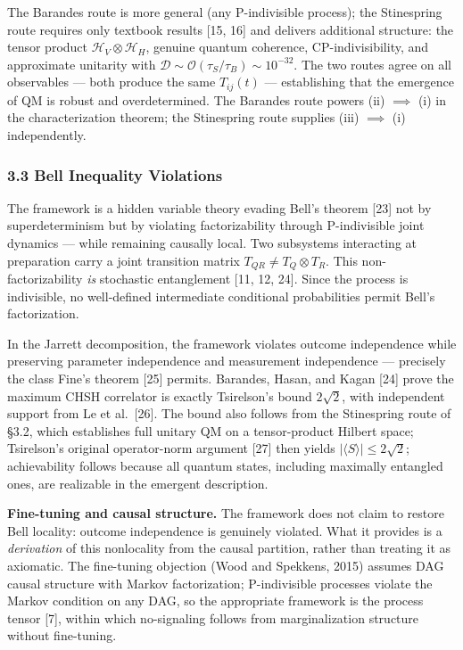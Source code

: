 \documentclass[
]{article}
\begin{document}
The Barandes route is more general (any P-indivisible process); the
Stinespring route requires only textbook results {[}15, 16{]} and
delivers additional structure: the tensor product
\(\mathcal{H}_V \otimes \mathcal{H}_H\), genuine quantum coherence,
CP-indivisibility, and approximate unitarity with
\(\mathcal{D} \sim \mathcal{O}(\tau_S / \tau_B) \sim 10^{-32}\). The two
routes agree on all observables --- both produce the same \(T_{ij}(t)\)
--- establishing that the emergence of QM is robust and overdetermined.
The Barandes route powers (ii) \(\implies\) (i) in the characterization
theorem; the Stinespring route supplies (iii) \(\implies\) (i)
independently.

\hypertarget{bell-inequality-violations}{%
\subsubsection{3.3 Bell Inequality
Violations}\label{bell-inequality-violations}}

The framework is a hidden variable theory evading Bell's theorem
{[}23{]} not by superdeterminism but by violating factorizability
through P-indivisible joint dynamics --- while remaining causally local.
Two subsystems interacting at preparation carry a joint transition
matrix \(T_{QR} \neq T_Q \otimes T_R\). This non-factorizability
\emph{is} stochastic entanglement {[}11, 12, 24{]}. Since the process is
indivisible, no well-defined intermediate conditional probabilities
permit Bell's factorization.

In the Jarrett decomposition, the framework violates outcome
independence while preserving parameter independence and measurement
independence --- precisely the class Fine's theorem {[}25{]} permits.
Barandes, Hasan, and Kagan {[}24{]} prove the maximum CHSH correlator is
exactly Tsirelson's bound \(2\sqrt{2}\), with independent support from
Le et al.~{[}26{]}. The bound also follows from the Stinespring route of
§3.2, which establishes full unitary QM on a tensor-product Hilbert
space; Tsirelson's original operator-norm argument {[}27{]} then yields
\(|\langle S \rangle| \leq 2\sqrt{2}\); achievability follows because
all quantum states, including maximally entangled ones, are realizable
in the emergent description.

\textbf{Fine-tuning and causal structure.} The framework does not claim
to restore Bell locality: outcome independence is genuinely violated.
What it provides is a \emph{derivation} of this nonlocality from the
causal partition, rather than treating it as axiomatic. The fine-tuning
objection (Wood and Spekkens, 2015) assumes DAG causal structure with
Markov factorization; P-indivisible processes violate the Markov
condition on any DAG, so the appropriate framework is the process tensor
{[}7{]}, within which no-signaling follows from marginalization
structure without fine-tuning.
\end{document}

